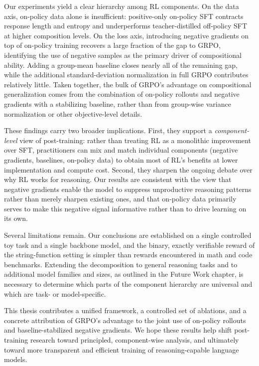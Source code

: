 \documentclass[12pt]{cmuthesis}
\begin{document}
Our experiments yield a clear hierarchy among RL components. On the data axis, on-policy data alone is insufficient: positive-only on-policy SFT contracts response length and entropy and underperforms teacher-distilled off-policy SFT at higher composition levels. On the loss axis, introducing negative gradients on top of on-policy training recovers a large fraction of the gap to GRPO, identifying the use of negative samples as the primary driver of compositional ability. Adding a group-mean baseline closes nearly all of the remaining gap, while the additional standard-deviation normalization in full GRPO contributes relatively little. Taken together, the bulk of GRPO's advantage on compositional generalization comes from the combination of on-policy rollouts and negative gradients with a stabilizing baseline, rather than from group-wise variance normalization or other objective-level details.

These findings carry two broader implications. First, they support a \emph{component-level} view of post-training: rather than treating RL as a monolithic improvement over SFT, practitioners can mix and match individual components (negative gradients, baselines, on-policy data) to obtain most of RL's benefits at lower implementation and compute cost. Second, they sharpen the ongoing debate over why RL works for reasoning. Our results are consistent with the view that negative gradients enable the model to suppress unproductive reasoning patterns rather than merely sharpen existing ones, and that on-policy data primarily serves to make this negative signal informative rather than to drive learning on its own.

Several limitations remain. Our conclusions are established on a single controlled toy task and a single backbone model, and the binary, exactly verifiable reward of the string-function setting is simpler than rewards encountered in math and code benchmarks. Extending the decomposition to general reasoning tasks and to additional model families and sizes, as outlined in the Future Work chapter, is necessary to determine which parts of the component hierarchy are universal and which are task- or model-specific.

This thesis contributes a unified framework, a controlled set of ablations, and a concrete attribution of GRPO's advantage to the joint use of on-policy rollouts and baseline-stabilized negative gradients. We hope these results help shift post-training research toward principled, component-wise analysis, and ultimately toward more transparent and efficient training of reasoning-capable language models.
\end{document}
